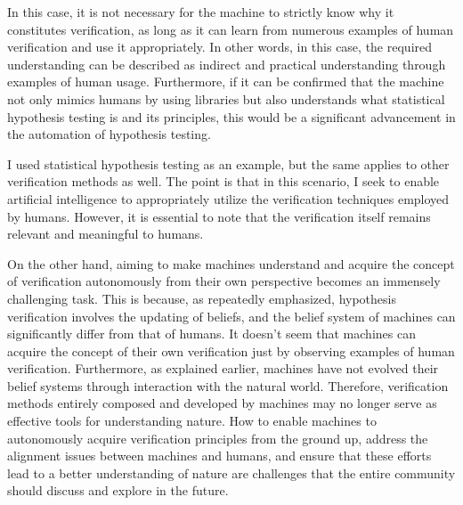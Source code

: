 In this case, it is not necessary for the machine to strictly know why it constitutes verification, as long as it can learn from numerous examples of human verification and use it appropriately. In other words, in this case, the required understanding can be described as indirect and practical understanding through examples of human usage. Furthermore, if it can be confirmed that the machine not only mimics humans by using libraries but also understands what statistical hypothesis testing is and its principles, this would be a significant advancement in the automation of hypothesis testing. 

I used statistical hypothesis testing as an example, but the same applies to other verification methods as well. The point is that in this scenario, I seek to enable artificial intelligence to appropriately utilize the verification techniques employed by humans. However, it is essential to note that the verification itself remains relevant and meaningful to humans.

On the other hand, aiming to make machines understand and acquire the concept of verification autonomously from their own perspective becomes an immensely challenging task. This is because, as repeatedly emphasized, hypothesis verification involves the updating of beliefs, and the belief system of machines can significantly differ from that of humans. It doesn't seem that machines can acquire the concept of their own verification just by observing examples of human verification. Furthermore, as explained earlier, machines have not evolved their belief systems through interaction with the natural world. Therefore, verification methods entirely composed and developed by machines may no longer serve as effective tools for understanding nature. How to enable machines to autonomously acquire verification principles from the ground up, address the alignment issues between machines and humans, and ensure that these efforts lead to a better understanding of nature are challenges that the entire community should discuss and explore in the future.


